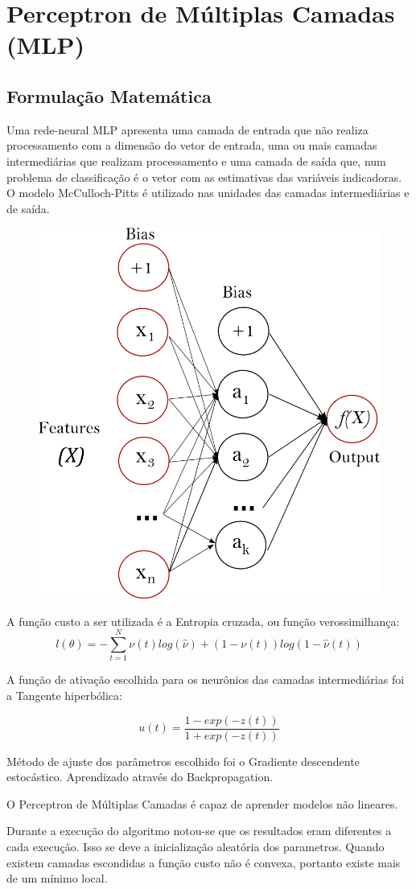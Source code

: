 \documentclass[11pt,a4paper]{article}
\numberwithin{equation}{section}
\begin{document}
\section{Perceptron de Múltiplas Camadas (MLP)}
\subsection{Formulação Matemática}
Uma rede-neural MLP apresenta uma camada de entrada que não realiza processamento com a dimensão do vetor de entrada, uma ou mais camadas intermediárias que realizam processamento e uma camada de saída que, num problema de classificação é o vetor com as estimativas das variáveis indicadoras. O modelo McCulloch-Pitts é utilizado nas unidades das camadas intermediárias e de saída.

\begin{figure}[H]
\centering
  \includegraphics[width=0.43\linewidth]{../img/multilayerperceptron_network.png}
  \label{fig:percep}
\end{figure}%

A função custo a ser utilizada é a Entropia cruzada, ou função verossimilhança:
\[ l(\theta) = -\sum_{t=1}^N \nu(t)log(\hat{\nu}) + (1-\nu(t)) log(1-\hat{\nu}(t)) \]

A função de ativação escolhida para os neurônios das camadas intermediárias foi a Tangente hiperbólica:

\[ u(t) = \frac{1- exp(-z(t))}{1+exp(-z(t))}\]

 Método de ajuste dos parâmetros escolhido foi o Gradiente descendente estocástico. Aprendizado através do Backpropagation.

O Perceptron de Múltiplas Camadas é capaz de aprender modelos não lineares.

Durante a execução do algoritmo notou-se que os resultados eram diferentes a cada execução. Isso se deve a inicialização aleatória dos parametros. Quando existem camadas escondidas a função custo não é convexa, portanto existe mais de um mínimo local.
\end{document}
